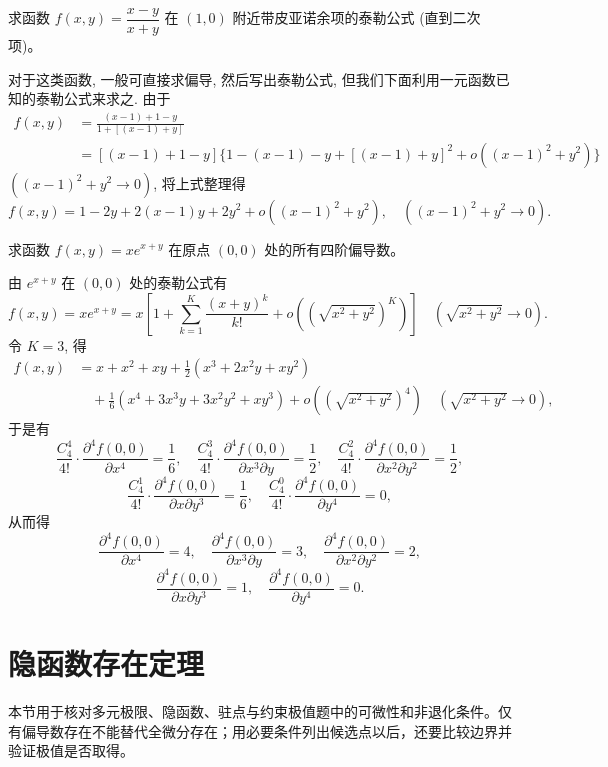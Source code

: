 \documentclass[12pt,fontset=fandol]{ctexart}
\begin{document}
\begin{example}\label{course-example-14-3-1}\quad 求函数 $f(x,y)=\dfrac{x-y}{x+y}$ 在 $(1,0)$ 附近带皮亚诺余项的泰勒公式 (直到二次项)。

\end{example}
\begin{solve}\quad 对于这类函数, 一般可直接求偏导, 然后写出泰勒公式, 但我们下面利用一元函数已知的泰勒公式来求之. 由于
\[
\begin{aligned}
  f(x,y)
  &=\frac{(x-1)+1-y}{1+[(x-1)+y]}\\
  &=[(x-1)+1-y]\{1-(x-1)-y+[(x-1)+y]^2
  +o((x-1)^2+y^2)\}
\end{aligned}
\]
$((x-1)^2+y^2\to0)$, 将上式整理得
\[
  f(x,y)=1-2y+2(x-1)y+2y^2+o((x-1)^2+y^2),
  \quad ((x-1)^2+y^2\to0).
\]

\end{solve}
\begin{example}\label{course-example-14-3-2}\quad 求函数 $f(x,y)=xe^{x+y}$ 在原点 $(0,0)$ 处的所有四阶偏导数。

\end{example}
\begin{solve}\quad 由 $e^{x+y}$ 在 $(0,0)$ 处的泰勒公式有
\[
  f(x,y)=xe^{x+y}
  =x\left[1+\sum_{k=1}^K\frac{(x+y)^k}{k!}
  +o\left((\sqrt{x^2+y^2})^K\right)\right]
  \quad(\sqrt{x^2+y^2}\to0).
\]
令 $K=3$, 得
\[
\begin{aligned}
  f(x,y)
  &=x+x^2+xy+\frac12(x^3+2x^2y+xy^2)\\
  &\quad+\frac16(x^4+3x^3y+3x^2y^2+xy^3)
  +o\left((\sqrt{x^2+y^2})^4\right)
  \quad(\sqrt{x^2+y^2}\to0),
\end{aligned}
\]
于是有
\[
  \frac{C_4^4}{4!}\cdot\frac{\partial^4 f(0,0)}{\partial x^4}=\frac16,\quad
  \frac{C_4^3}{4!}\cdot\frac{\partial^4 f(0,0)}{\partial x^3\partial y}=\frac12,\quad
  \frac{C_4^2}{4!}\cdot\frac{\partial^4 f(0,0)}{\partial x^2\partial y^2}=\frac12,
\]
\[
  \frac{C_4^1}{4!}\cdot\frac{\partial^4 f(0,0)}{\partial x\partial y^3}=\frac16,\quad
  \frac{C_4^0}{4!}\cdot\frac{\partial^4 f(0,0)}{\partial y^4}=0,
\]
从而得
\[
  \frac{\partial^4 f(0,0)}{\partial x^4}=4,\quad
  \frac{\partial^4 f(0,0)}{\partial x^3\partial y}=3,\quad
  \frac{\partial^4 f(0,0)}{\partial x^2\partial y^2}=2,
\]
\[
  \frac{\partial^4 f(0,0)}{\partial x\partial y^3}=1,\quad
  \frac{\partial^4 f(0,0)}{\partial y^4}=0.
\]

\end{solve}


\section{隐函数存在定理}\label{course-14-4}
本节用于核对多元极限、隐函数、驻点与约束极值题中的可微性和非退化条件。仅有偏导数存在不能替代全微分存在；用必要条件列出候选点以后，还要比较边界并验证极值是否取得。
\end{document}
